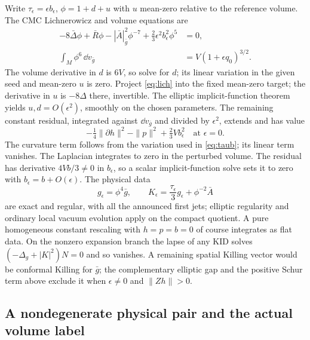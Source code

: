 Write \(\tau_\epsilon=\epsilon b_\epsilon\), \(\phi=1+d+u\) with \(u\) mean-zero relative to the reference volume. The CMC Lichnerowicz and volume equations are
\begin{align}
 -8\bar\Delta\phi+\bar R\phi
 -|\bar A|_{\bar g}^{2}\phi^{-7}+\tfrac23\epsilon^2b_\epsilon^2\phi^5&=0,\label{eq:lich}\\
 \int_M\phi^6\,\dd v_{\bar g}&=V(1+\epsilon q_0)^{3/2}.\label{eq:volume}
\end{align}
The volume derivative in \(d\) is \(6V\), so solve for \(d\); its linear variation in the given seed and mean-zero \(u\) is zero. Project \eqref{eq:lich} into the fixed mean-zero target; the derivative in \(u\) is \(-8\Delta\) there, invertible. The elliptic implicit-function theorem yields \(u,d=O(\epsilon^2)\), smoothly on the chosen parameters. The remaining constant residual, integrated against \(\dd v_{\bar g}\) and divided by \(\epsilon^2\), extends and has value
\[
     -\tfrac14\|\partial h\|^2-\|p\|^2+\tfrac23 Vb_\epsilon^2
                \quad \text{at }\epsilon=0 .
\]
The curvature term follows from the variation used in \eqref{eq:taub}; its linear term vanishes. The Laplacian integrates to zero in the perturbed volume. The residual has derivative \(4Vb/3\ne0\) in \(b_\epsilon\), so a scalar implicit-function solve sets it to zero with \(b_\epsilon=b+O(\epsilon)\). The physical data
\[
 g_\epsilon=\phi^4\bar g,\qquad
 K_\epsilon=\frac{\tau_\epsilon}{3}g_\epsilon+\phi^{-2}\bar A
\]
are exact and regular, with all the announced first jets; elliptic regularity and ordinary local vacuum evolution apply on the compact quotient. A pure homogeneous constant rescaling with \(h=p=b=0\) of course integrates as flat data. On the nonzero expansion branch the lapse of any KID solves \((-\Delta_g+|K|^2)N=0\) and so vanishes. A remaining spatial Killing vector would be conformal Killing for \(\bar g\); the complementary elliptic gap and the positive Schur term above exclude it when \(\epsilon\ne0\) and \(\|Zh\|>0\).

\subsection{A nondegenerate physical pair and the actual volume label}

